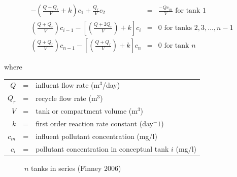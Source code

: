 \documentclass[titlepage,12pt]{article}
\begin{document}
\begin{eqnarray}
-\left(\frac{Q+Q_r}{V}+k\right)c_1+\frac{Q_r}{V}c_2 & = &
\frac{-Qc_{in}}{V}
\mbox{ for tank 1} \nonumber \\
\left(\frac{Q+Q_r}{V}\right)c_{i-1}-\left[\left(\frac{Q+2Q_r}{V}\right)+k\right]c_i
& = & 0
\mbox{ for tanks } 2,3,\ldots,n-1\\
\left(\frac{Q+Q_r}{V}\right)c_{n-1}-\left[\left(\frac{Q+Q_r}{V}\right)+k\right]c_n
& = &0 \mbox{ for tank } n \nonumber
\end{eqnarray}
\begin{singlespacing}
where
\begin{center}
\begin{tabular}{rcl}
$Q$&=&influent flow rate (m$^3$/day)\\
$Q_r$&=&recycle flow rate (m$^3$)\\
$V$ &=&tank or compartment volume (m$^3$)\\
$k$&=&first order reaction rate constant (day$^-1$)\\
$c_{in}$&=&influent pollutant concentration (mg/l)\\
$c_{i}$&=&pollutant concentration in conceptual tank $i$ (mg/l)
\end{tabular}
\end{center}
\end{singlespacing}
\begin{figure}[h]\label{fig:tanks}
\begin{center}
 \caption{$n$ tanks in
series (Finney 2006)}
\end{center}
\end{figure}
\end{document}

